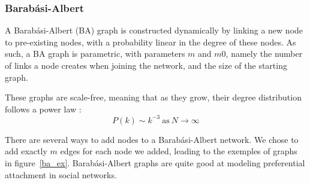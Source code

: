 \documentclass[10pt,a4paper]{scrartcl}
\begin{document}
\subsubsection{Barabási-Albert}
A Barabási-Albert (BA) graph is constructed dynamically by linking a new node to pre-existing nodes, with a probability linear in the degree of these nodes. As such, a BA graph is parametric, with parameters $m$ and $m0$, namely the number of links a node creates when joining the network, and the size of the starting graph.

These graphs are scale-free, meaning that as they grow, their degree distribution follows a power law :
$$P(k) \sim k^{-3}~\text{as}~N\rightarrow \infty$$

There are several ways to add nodes to a Barabási-Albert network. We chose to add exactly $m$ edges for each node we added, leading to the exemples of graphs in figure~\ref{ba_ex}. Barabási-Albert graphs are quite good at modeling preferential attachment in social networks. \cite{wasserman1994social,}
\end{document}
